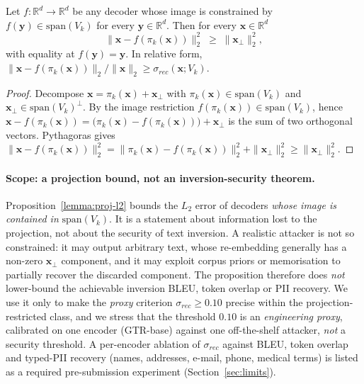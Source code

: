 \begin{proposition}\label{lemma:proj-l2}
Let $f : \mathbb{R}^d \to \mathbb{R}^d$ be any decoder whose image is
constrained by $f(\mathbf{y}) \in \mathrm{span}(V_k)$ for every
$\mathbf{y} \in \mathbb{R}^d$. Then for every
$\mathbf{x} \in \mathbb{R}^d$
\[
\| \mathbf{x} - f(\pi_k(\mathbf{x})) \|_2^{2}
\;\geq\; \| \mathbf{x}_\perp \|_2^{2},
\]
with equality at $f(\mathbf{y}) = \mathbf{y}$. In relative form,
$\| \mathbf{x} - f(\pi_k(\mathbf{x})) \|_2 / \|\mathbf{x}\|_2
\geq \sigma_{rec}(\mathbf{x}; V_k)$.
\end{proposition}

\begin{proof}
Decompose $\mathbf{x} = \pi_k(\mathbf{x}) + \mathbf{x}_\perp$ with
$\pi_k(\mathbf{x}) \in \mathrm{span}(V_k)$ and
$\mathbf{x}_\perp \in \mathrm{span}(V_k)^\perp$. By the image
restriction $f(\pi_k(\mathbf{x})) \in \mathrm{span}(V_k)$, hence
$\mathbf{x} - f(\pi_k(\mathbf{x})) =
\bigl( \pi_k(\mathbf{x}) - f(\pi_k(\mathbf{x})) \bigr) + \mathbf{x}_\perp$
is the sum of two orthogonal vectors. Pythagoras gives
$\| \mathbf{x} - f(\pi_k(\mathbf{x})) \|_2^{2}
= \| \pi_k(\mathbf{x}) - f(\pi_k(\mathbf{x})) \|_2^{2}
+ \| \mathbf{x}_\perp \|_2^{2}
\geq \| \mathbf{x}_\perp \|_2^{2}$.
\end{proof}

\paragraph{Scope: a projection bound, not an inversion-security
theorem.} Proposition~\ref{lemma:proj-l2} bounds the $L_2$ error of
decoders \emph{whose image is contained in} $\mathrm{span}(V_k)$. It is a
statement about information lost to the projection, not about the
security of text inversion. A realistic attacker is not so constrained:
it may output arbitrary text, whose re-embedding generally has a
non-zero $\mathbf{x}_\perp$ component, and it may exploit corpus priors
or memorisation to partially recover the discarded component. The
proposition therefore does \emph{not} lower-bound the achievable inversion BLEU,
token overlap or PII recovery. We use it only to make the
\emph{proxy} criterion $\sigma_{rec} \geq 0.10$ precise within the
projection-restricted class, and we stress that the threshold $0.10$ is
an \emph{engineering proxy}, calibrated on one encoder (GTR-base) against
one off-the-shelf attacker, \emph{not} a security threshold. A
per-encoder ablation of $\sigma_{rec}$ against BLEU, token overlap and
typed-PII recovery (names, addresses, e-mail, phone, medical terms) is
listed as a required pre-submission experiment
(Section~\ref{sec:limits}).

